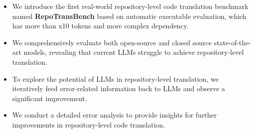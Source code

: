 \begin{itemize}[left=10pt]
    \item We introduce the first real-world repository-level code translation benchmark named \textbf{RepoTransBench} based on automatic executable evaluation, which has more than x10 tokens and more complex dependency.
    \item We comprehensively evaluate both open-source and closed source state-of-the-art models, revealing that current LLMs struggle to achieve repository-level translation.
    \item To explore the potential of LLMs in repository-level translation, we iteratively feed error-related information back to LLMs and observe a significant improvement.
    \item We conduct a detailed error analysis to provide insights for further improvements in repository-level code translation.
\end{itemize}


